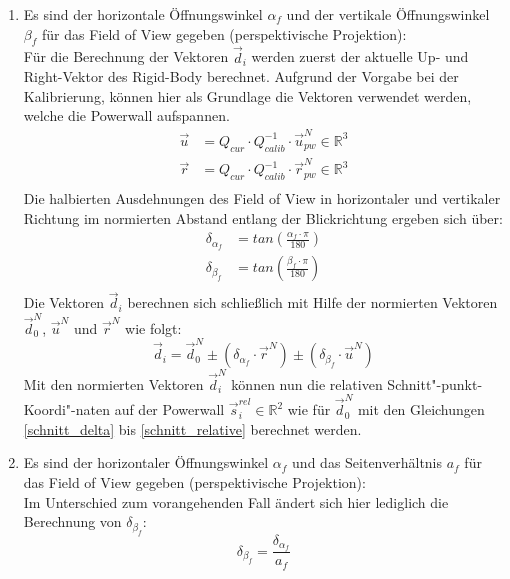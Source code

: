 \documentclass[]{article}
\newcommand{\POW}{Powerwall}
\newcommand{\FOV}{Field of View}
\begin{document}
\begin{enumerate}
    \item Es sind der horizontale Öffnungswinkel $\alpha_{f}$ und der vertikale Öffnungswinkel $\beta_{f}$ für das \FOV{} gegeben (\glqq{}perspektivische Projektion\grqq{}):\\
        Für die Berechnung der Vektoren $\overrightarrow{d}_{i}$ werden zuerst der aktuelle \glqq{}Up\grqq{}- und \glqq{}Right\grqq{}-Vektor des Rigid-Body berechnet.
        Aufgrund der Vorgabe bei der Kalibrierung, können hier als Grundlage die Vektoren verwendet werden, welche die \POW{} aufspannen.
        \begin{equation}
            \begin{split}
                \overrightarrow{u} &= Q_{cur} \cdot Q^{-1}_{calib} \cdot \overrightarrow{u}_{pw}^{N} \in \mathbb{R}^{3}\\
                \overrightarrow{r} &= Q_{cur} \cdot Q^{-1}_{calib} \cdot \overrightarrow{r}_{pw}^{N} \in \mathbb{R}^{3}\\
            \end{split}         
        \end{equation}
        Die halbierten Ausdehnungen des \FOV{} in horizontaler und vertikaler Richtung im normierten Abstand entlang der Blickrichtung ergeben sich über:
        \begin{equation}
            \begin{split}
                \delta_{\alpha_{f}} &= tan(\frac{\alpha_{f} \cdot \pi}{180})\\
                \delta_{\beta_{f}}  &= tan(\frac{\beta_{f} \cdot \pi}{180})\\
            \end{split}         
        \end{equation}
        Die Vektoren $\overrightarrow{d}_{i}$ berechnen sich schließlich mit Hilfe der normierten Vektoren $\overrightarrow{d}^{N}_{0}$, $\overrightarrow{u}^{N}$ und $\overrightarrow{r}^{N}$  wie folgt:
        \begin{equation}
            \overrightarrow{d}_{i} = \overrightarrow{d}^{N}_{0} \pm(\delta_{\alpha_{f}} \cdot \overrightarrow{r}^{N}) \pm (\delta_{\beta_{f}} \cdot \overrightarrow{u}^{N})
        \end{equation}
        Mit den normierten Vektoren $\overrightarrow{d}_{i}^{N}$ können nun die relativen Schnitt"-punkt-Koordi"-naten auf der \POW{} $\overrightarrow{s}_{i}^{rel} \in \mathbb{R}^2$ wie für $\overrightarrow{d}_{0}^{N}$ mit den Gleichungen \ref{schnitt_delta} bis \ref{schnitt_relative} berechnet werden.

    \item Es sind der horizontaler Öffnungswinkel $\alpha_{f}$ und das Seitenverhältnis $a_{f}$ für das \FOV{} gegeben (\glqq{}perspektivische Projektion\grqq{}):\\
        Im Unterschied zum vorangehenden Fall ändert sich hier lediglich die Berechnung von $\delta_{\beta_{f}}$:
        \begin{equation}
            \delta_{\beta_{f}}  = \frac{\delta_{\alpha_{f}}}{a_{f}}
        \end{equation}
        
\end{enumerate}
\end{document}
